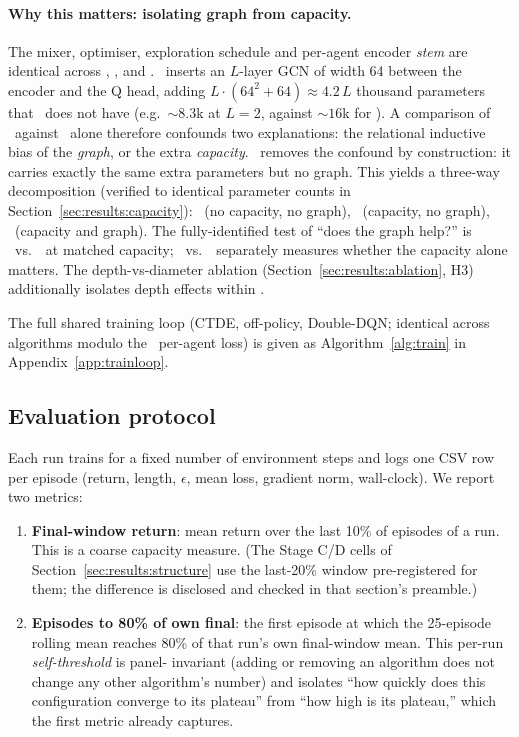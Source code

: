 \paragraph{Why this matters: isolating graph from capacity.} The mixer,
optimiser, exploration schedule and per-agent encoder \emph{stem} are
identical across \qmix, \gnnqmix, and \mlpqmix. \gnnqmix\ inserts an
$L$-layer GCN of width 64 between the encoder and the Q head, adding
$L \cdot (64^2 + 64) \approx 4.2\,L$ thousand parameters that \qmix\ does
not have (e.g.\ $\sim 8.3$k at $L=2$, against $\sim 16$k for \qmix). A
comparison of \gnnqmix\ against \qmix\ alone therefore confounds two
explanations: the relational inductive bias of the \emph{graph}, or the
extra \emph{capacity}. \mlpqmix\ removes the confound by construction: it
carries exactly the same extra parameters but no graph. This yields a
three-way decomposition (verified to identical parameter counts in
Section~\ref{sec:results:capacity}): \qmix\ (no capacity, no graph),
\mlpqmix\ (capacity, no graph), \gnnqmix\ (capacity and graph). The
fully-identified test of ``does the graph help?'' is \gnnqmix\ vs.\
\mlpqmix\ at matched capacity; \mlpqmix\ vs.\ \qmix\ separately measures
whether the capacity alone matters. The depth-vs-diameter ablation
(Section~\ref{sec:results:ablation}, H3) additionally isolates depth
effects within \gnnqmix.

The full shared training loop (CTDE, off-policy, Double-DQN; identical
across algorithms modulo the \iql\ per-agent loss) is given as
Algorithm~\ref{alg:train} in Appendix~\ref{app:trainloop}.

\subsection{Evaluation protocol}
\label{sec:protocol}

Each run trains for a fixed number of environment steps and logs one CSV
row per episode (return, length, $\epsilon$, mean loss, gradient norm,
wall-clock). We report two metrics:

\begin{enumerate}[leftmargin=*,itemsep=0pt,topsep=2pt]
  \item \textbf{Final-window return}: mean return over the last 10\% of
        episodes of a run. This is a coarse capacity measure. (The Stage
        C/D cells of Section~\ref{sec:results:structure} use the last-20\%
        window pre-registered for them; the difference is disclosed and
        checked in that section's preamble.)
  \item \textbf{Episodes to 80\% of own final}: the first episode at
        which the 25-episode rolling mean reaches 80\% of that run's own
        final-window mean. This per-run \emph{self-threshold} is panel-
        invariant (adding or removing an algorithm does not change any
        other algorithm's number) and isolates ``how quickly does this
        configuration converge to its plateau'' from ``how high is its
        plateau,'' which the first metric already captures.
\end{enumerate}

